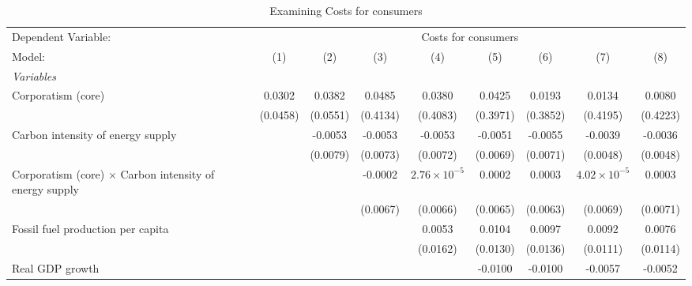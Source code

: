 
\begin{table}[htbp]
   \caption{Examining Costs for consumers}
   \centering
   \begin{tabular}{lcccccccc}
      \tabularnewline \midrule \midrule
      Dependent Variable: & \multicolumn{8}{c}{Costs for consumers}\\
      Model:                                                         & (1)      & (2)      & (3)      & (4)                   & (5)      & (6)      & (7)                   & (8)\\  
      \midrule
      \emph{Variables}\\
      Corporatism (core)                                             & 0.0302   & 0.0382   & 0.0485   & 0.0380                & 0.0425   & 0.0193   & 0.0134                & 0.0080\\   
                                                                     & (0.0458) & (0.0551) & (0.4134) & (0.4083)              & (0.3971) & (0.3852) & (0.4195)              & (0.4223)\\   
      Carbon intensity of energy supply                              &          & -0.0053  & -0.0053  & -0.0053               & -0.0051  & -0.0055  & -0.0039               & -0.0036\\   
                                                                     &          & (0.0079) & (0.0073) & (0.0072)              & (0.0069) & (0.0071) & (0.0048)              & (0.0048)\\   
      Corporatism (core) $\times$ Carbon intensity of energy supply  &          &          & -0.0002  & $2.76\times 10^{-5}$  & 0.0002   & 0.0003   & $4.02\times 10^{-5}$  & 0.0003\\   
                                                                     &          &          & (0.0067) & (0.0066)              & (0.0065) & (0.0063) & (0.0069)              & (0.0071)\\   
      Fossil fuel production per capita                              &          &          &          & 0.0053                & 0.0104   & 0.0097   & 0.0092                & 0.0076\\   
                                                                     &          &          &          & (0.0162)              & (0.0130) & (0.0136) & (0.0111)              & (0.0114)\\   
      Real GDP growth                                                &          &          &          &                       & -0.0100  & -0.0100  & -0.0057               & -0.0052\\   

\end{tabular}
\end{table}
